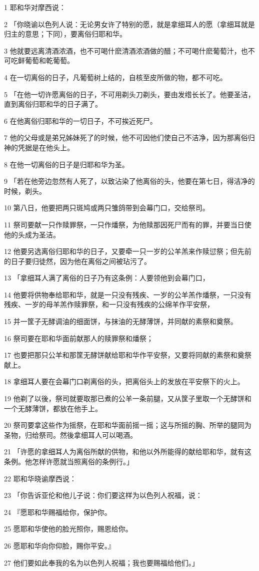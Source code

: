 \par 1 耶和华对摩西说：
\par 2 「你晓谕以色列人说：无论男女许了特别的愿，就是拿细耳人的愿（拿细耳就是归主的意思；下同），要离俗归耶和华。
\par 3 他就要远离清酒浓酒，也不可喝什麽清酒浓酒做的醋；不可喝什麽葡萄汁，也不可吃鲜葡萄和乾葡萄。
\par 4 在一切离俗的日子，凡葡萄树上结的，自核至皮所做的物，都不可吃。
\par 5 「在他一切许愿离俗的日子，不可用剃头刀剃头，要由发绺长长了。他要圣洁，直到离俗归耶和华的日子满了。
\par 6 在他离俗归耶和华的一切日子，不可挨近死尸。
\par 7 他的父母或是弟兄姊妹死了的时候，他不可因他们使自己不洁净，因为那离俗归神的凭据是在他头上。
\par 8 在他一切离俗的日子是归耶和华为圣。
\par 9 「若在他旁边忽然有人死了，以致沾染了他离俗的头，他要在第七日，得洁净的时候，剃头。
\par 10 第八日，他要把两只斑鸠或两只雏鸽带到会幕门口，交给祭司。
\par 11 祭司要献一只作赎罪祭，一只作燔祭，为他赎那因死尸而有的罪，并要当日使他的头成为圣洁。
\par 12 他要另选离俗归耶和华的日子，又要牵一只一岁的公羊羔来作赎愆祭；但先前的日子要归徒然，因为他在离俗之间被玷污了。
\par 13 「拿细耳人满了离俗的日子乃有这条例：人要领他到会幕门口，
\par 14 他要将供物奉给耶和华，就是一只没有残疾、一岁的公羊羔作燔祭，一只没有残疾、一岁的母羊羔作赎罪祭，和一只没有残疾的公绵羊作平安祭，
\par 15 并一筐子无酵调油的细面饼，与抹油的无酵薄饼，并同献的素祭和奠祭。
\par 16 祭司要在耶和华面前献那人的赎罪祭和燔祭；
\par 17 也要把那只公羊和那筐无酵饼献给耶和华作平安祭，又要将同献的素祭和奠祭献上。
\par 18 拿细耳人要在会幕门口剃离俗的头，把离俗头上的发放在平安祭下的火上。
\par 19 他剃了以後，祭司就要取那已煮的公羊一条前腿，又从筐子里取一个无酵饼和一个无酵薄饼，都放在他手上。
\par 20 祭司要拿这些作为摇祭，在耶和华面前摇一摇；这与所摇的胸、所举的腿同为圣物，归给祭司。然後拿细耳人可以喝酒。
\par 21 「许愿的拿细耳人为离俗所献的供物，和他以外所能得的献给耶和华，就有这条例。他怎样许愿就当照离俗的条例行。」
\par 22 耶和华晓谕摩西说：
\par 23 「你告诉亚伦和他儿子说：你们要这样为以色列人祝福，说：
\par 24 『愿耶和华赐福给你，保护你。
\par 25 愿耶和华使他的脸光照你，赐恩给你。
\par 26 愿耶和华向你仰脸，赐你平安。』
\par 27 他们要如此奉我的名为以色列人祝福；我也要赐福给他们。」

